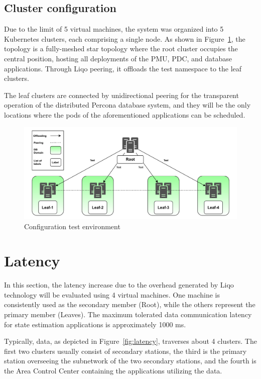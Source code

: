 \subsection{Cluster configuration}
Due to the limit of 5 virtual machines, the system was organized into 5 Kubernetes clusters, each comprising a single node. As shown in Figure~\ref{fig:test}, the topology is a fully-meshed star topology where the root cluster occupies the central position, hosting all deployments of the PMU, PDC, and database applications. Through Liqo peering, it offloads the test namespace to the leaf clusters.

The leaf clusters are connected by unidirectional peering for the transparent operation of the distributed Percona database system, and they will be the only locations where the pods of the aforementioned applications can be scheduled.

\begin{figure}[ht]\centering
\includegraphics[scale=0.6]{Pictures/test}
\caption{Configuration test environment}\label{fig:test}
\end{figure}

\section{Latency}
In this section, the latency increase due to the overhead generated by Liqo technology will be evaluated using 4 virtual machines. One machine is consistently used as the secondary member (Root), while the others represent the primary member (Leaves). The maximum tolerated data communication latency for state estimation applications is approximately 1000 ms.

Typically, data, as depicted in Figure~\ref{fig:latency}, traverses about 4 clusters. The first two clusters usually consist of secondary stations, the third is the primary station overseeing the subnetwork of the two secondary stations, and the fourth is the Area Control Center containing the applications utilizing the data.

